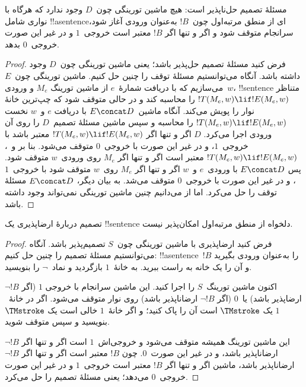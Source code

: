 \documentclass[../../../include/open-logic-section]{subfiles}
\begin{document}

\begin{thm}
مسئلهٔ تصمیم حل‌ناپذیر است: هیچ ماشین تورینگی چون~$D$ وجود ندارد که
هرگاه با نواری شامل !!a{sentence}ای از منطق مرتبه‌اول چون~$!B$ به‌عنوان
ورودی آغاز شود، سرانجام متوقف شود و اگر و تنها اگر $!B$ معتبر است
خروجی~$1$ و در غیر این صورت خروجی~$0$ بدهد.
\end{thm}

\begin{proof}
فرض کنید مسئلهٔ تصمیم حل‌پذیر باشد؛ یعنی ماشین تورینگی چون~$D$ وجود
داشته باشد. آنگاه می‌توانستیم مسئلهٔ توقف را چنین حل کنیم. ماشین
تورینگی چون~$E$ می‌سازیم که با دریافت شمارهٔ~$e$ از ماشین تورینگ
$M_e$ و ورودی~$w$، !!{sentence}ٔ متناظر
$!T(M_e,w)\lif !E(M_e,w)$ را محاسبه کند و در حالی متوقف شود که
چپ‌ترین خانهٔ نوار را پویش می‌کند. آنگاه ماشین~$E\concat D$ با دریافت
$e$ و~$w$ نخست $!T(M_e,w)\lif !E(M_e,w)$ را محاسبه و سپس ماشین
مسئلهٔ تصمیم~$D$ را روی آن ورودی اجرا می‌کرد. $D$ اگر و تنها اگر
$!T(M_e,w)\lif !E(M_e,w)$ معتبر باشد با خروجی~$1$، و در غیر این صورت
با خروجی~$0$ متوقف می‌شود. بنا بر
 و~،
$!T(M_e,w)\lif !E(M_e,w)$ معتبر است اگر و تنها اگر $M_e$ روی
ورودی~$w$ متوقف شود. پس $E\concat D$ با ورودی~$e$ و~$w$ اگر و تنها
اگر $M_e$ روی~$w$ متوقف شود با خروجی~$1$، و در غیر این صورت با
خروجی~$0$ متوقف می‌شد. به بیان دیگر، $E\concat D$ مسئلهٔ توقف را حل
می‌کرد. اما از  می‌دانیم چنین ماشین
تورینگی نمی‌تواند وجود داشته باشد.
\end{proof}

\begin{cor}%
تصمیم دربارهٔ ارضاپذیری یک !!{sentence}ٔ دلخواه از منطق مرتبه‌اول
امکان‌پذیر نیست.
\end{cor}

\begin{proof}
  فرض کنید ارضاپذیری با ماشین تورینگی چون~$S$ تصمیم‌پذیر باشد. آنگاه
  می‌توانستیم مسئلهٔ تصمیم را چنین حل کنیم: !!a{sentence}ٔ~$!B$ را به‌عنوان
  ورودی بگیرید و آن را یک خانه به راست ببرید. به خانهٔ~$1$ بازگردید
  و نماد~$\lnot$ را بنویسید.

  اکنون ماشین تورینگ~$S$ را اجرا کنید. این ماشین سرانجام با خروجی
  $1$ (اگر $\lnot !B$ ارضاپذیر باشد) یا~$0$ (اگر $\lnot !B$
  ارضاناپذیر باشد) روی نوار متوقف می‌شود. اگر در خانهٔ~$1$ یک
  $\TMstroke$ است آن را پاک کنید؛ و اگر خانهٔ~$1$ خالی است یک
  $\TMstroke$ بنویسید و سپس متوقف شوید.

  این ماشین تورینگ همیشه متوقف می‌شود و خروجی‌اش~$1$ است اگر و تنها
  اگر $\lnot !B$ ارضاناپذیر باشد، و در غیر این صورت~$0$. چون $!B$
  معتبر است اگر و تنها اگر $\lnot !B$ ارضاناپذیر باشد، ماشین اگر و
  تنها اگر $!B$ معتبر است خروجی~$1$ و در غیر این صورت خروجی~$0$
  می‌دهد؛ یعنی مسئلهٔ تصمیم را حل می‌کرد.
\end{proof}
\end{document}
